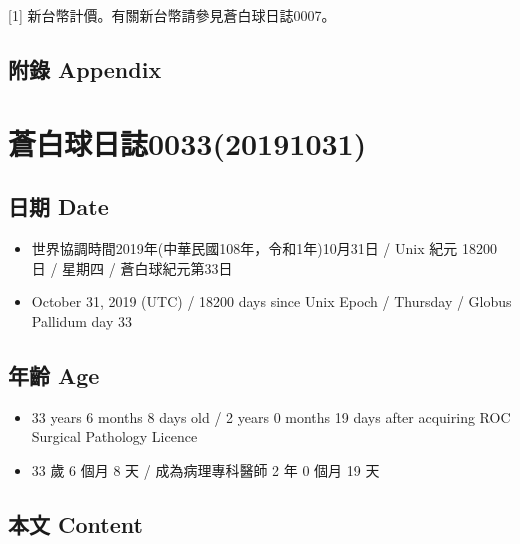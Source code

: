 \documentclass[a5paper, 12pt
]{book}
\providecommand{\tightlist}{%
  \setlength{\itemsep}{0pt}\setlength{\parskip}{0pt}}
\begin{document}
{[}1{]} 新台幣計價。有關新台幣請參見蒼白球日誌0007。

\hypertarget{ux9644ux9304-appendix-24}{%
\subsection{附錄 Appendix}\label{ux9644ux9304-appendix-24}}

\hypertarget{ux84bcux767dux7403ux65e5ux8a8c003320191031}{%
\section{蒼白球日誌0033(20191031)}\label{ux84bcux767dux7403ux65e5ux8a8c003320191031}}

\hypertarget{ux65e5ux671f-date-30}{%
\subsection{日期 Date}\label{ux65e5ux671f-date-30}}

\begin{itemize}
\tightlist
\item
  世界協調時間2019年(中華民國108年，令和1年)10月31日 / Unix 紀元 18200
  日 / 星期四 / 蒼白球紀元第33日
\item
  October 31, 2019 (UTC) / 18200 days since Unix Epoch / Thursday /
  Globus Pallidum day 33
\end{itemize}

\hypertarget{ux5e74ux9f61-age-30}{%
\subsection{年齡 Age}\label{ux5e74ux9f61-age-30}}

\begin{itemize}
\tightlist
\item
  33 years 6 months 8 days old / 2 years 0 months 19 days after
  acquiring ROC Surgical Pathology Licence
\item
  33 歲 6 個月 8 天 / 成為病理專科醫師 2 年 0 個月 19 天
\end{itemize}

\hypertarget{ux672cux6587-content-30}{%
\subsection{本文 Content}\label{ux672cux6587-content-30}}
\end{document}

